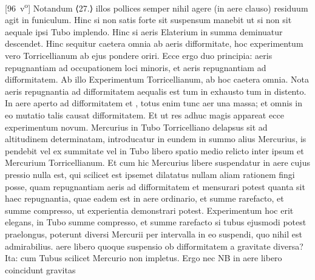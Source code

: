 [96~v\textsuperscript{o}] Notandum ⟨27.⟩ illos pollices semper nihil agere (in aere clauso) residuum  agit in funiculum\protect{}. Hinc si non satis forte sit suspensum manebit  ut si non sit aequale ipsi Tubo implendo. Hinc si aeris Elaterium\protect{}  in summa deminuatur descendet. Hinc sequitur caetera omnia  ab aeris difformitate, hoc experimentum vero Torricellianum\protect{} ab  ejus pondere oriri. Ecce ergo duo principia: aeris repugnantiam  ad occupationem loci minoris, et aeris repugnantiam  ad difformitatem. Ab illo Experimentum Torricellianum\protect{}, ab hoc caetera omnia.  Nota aeris repugnantia ad difformitatem aequalis est  tum in exhausto tum in distento. In aere aperto  ad difformitatem et ,  totus enim tunc aer una massa\protect{}; et omnis in eo mutatio talis causat  difformitatem. Et ut res adhuc magis appareat ecce experimentum novum. Mercurius\protect{} in Tubo Torricelliano\protect{} delapsus sit ad  altitudinem determinatam, introducatur in eundem in summo  alius Mercurius\protect{}, is pendebit vel ex summitate vel in Tubo  libero spatio medio relicto inter ipsum et Mercurium\protect{}  Torricellianum. Et cum hic Mercurius\protect{}  libere suspendatur  in aere cujus pressio nulla est, qui scilicet est ipsemet  dilatatus  nullam aliam rationem fingi  posse, quam repugnantiam aeris ad difformitatem  et mensurari potest quanta sit haec repugnantia, quae eadem  est in aere ordinario, et summe rarefacto, et summe  compresso, ut experientia demonstrari potest. Experimentum  hoc erit elegans,  in Tubo summe compresso, et summe rarefacto si  tubus ejusmodi potest praelongus, poterunt diversi Mercurii\protect{}  per intervalla in eo suspendi, quo nihil est admirabilius.  aere libero quoque suspensio ob difformitatem a gravitate\protect{} diversa? Ita: cum Tubus scilicet Mercurio\protect{} non  impletus. Ergo nec NB in aere libero coincidunt gravitas\protect{} 